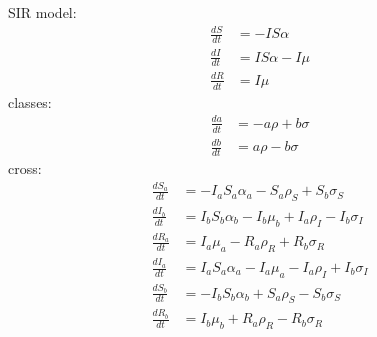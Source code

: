 \documentclass{article}
\begin{document}
SIR model:
\begin{align*}
\frac{dS}{dt} &= -I S \alpha\\
\frac{dI}{dt} &= I S \alpha - I \mu\\
\frac{dR}{dt} &= I \mu
\end{align*}classes:
\begin{align*}
\frac{da}{dt} &= -a \rho + b \sigma\\
\frac{db}{dt} &= a \rho - b \sigma
\end{align*}cross:
\begin{align*}
\frac{dS_{a}}{dt} &= -I_{a} S_{a} \alpha_{a} - S_{a} \rho_{S} + S_{b} \sigma_{S}\\
\frac{dI_{b}}{dt} &= I_{b} S_{b} \alpha_{b} - I_{b} \mu_{b} + I_{a} \rho_{I} - I_{b} \sigma_{I}\\
\frac{dR_{a}}{dt} &= I_{a} \mu_{a} - R_{a} \rho_{R} + R_{b} \sigma_{R}\\
\frac{dI_{a}}{dt} &= I_{a} S_{a} \alpha_{a} - I_{a} \mu_{a} - I_{a} \rho_{I} + I_{b} \sigma_{I}\\
\frac{dS_{b}}{dt} &= -I_{b} S_{b} \alpha_{b} + S_{a} \rho_{S} - S_{b} \sigma_{S}\\
\frac{dR_{b}}{dt} &= I_{b} \mu_{b} + R_{a} \rho_{R} - R_{b} \sigma_{R}
\end{align*}
\end{document}
